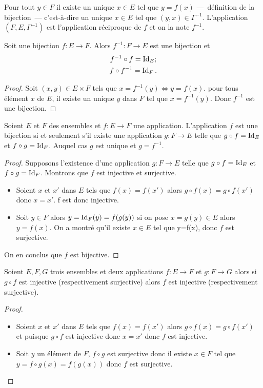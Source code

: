 Pour tout $y \in F$ il existe un unique $x \in E$ tel que $y=f(x)$ ---~définition de la bijection~--- c'est-à-dire un unique $x \in E$ tel que $(y,x) \in \Gamma^{-1}$. L'application $(F,E,\Gamma^{-1})$ est l'application réciproque de $f$ et on la note $f^{-1}$.
%
\begin{prop} Soit une bijection $f : E \longrightarrow F$. Alors $f^{-1} : F \longrightarrow E$ est une bijection et
  \begin{gather}
    f^{-1} \circ f =\operatorname{Id}_E; \\
    f \circ f^{-1}=\operatorname{Id}_F.
  \end{gather}
\end{prop}
\begin{proof}
Soit $(x,y) \in E \times F$ tels que $x=f^{-1}(y) \iff y=f(x)$. pour tous élément $x$ de $E$, il existe un unique $y$ dans $F$ tel que $x=f^{-1}(y)$. Donc $f^{-1}$ est une bijection.
\end{proof}
%
\begin{theo}
Soient $E$ et $F$ des ensembles et $f:E \longrightarrow F$ une application. L'application $f$ est une bijection si et seulement s'il existe une application $g:F \longrightarrow E$ telle que $g \circ f = \operatorname{Id}_E$ et $f \circ g = \operatorname{Id}_F$. Auquel cas $g$ est unique et $g=f^{-1}$.
\end{theo}
\begin{proof}
  Supposons l'existence d'une application $g:F \longrightarrow E$ telle que $g \circ f = \operatorname{Id}_E$ et $f \circ g = \operatorname{Id}_F$. Montrons que $f$ est injective et surjective.
  \begin{itemize}
  \item Soient $x$ et $x'$ dans $E$ tels que $f(x)=f(x')$ alors $g \circ f(x) = g \circ f(x')$ donc $x=x'$. f est donc injective.
  \item Soit $y \in F$ alors $y=\operatorname{Id}_F(y)=f(g(y))$ si on pose $x=g(y) \in E$ alors $y=f(x)$. On a montré qu'il existe $x \in E$ tel que y=f(x), donc $f$ est surjective.
  \end{itemize}
  On en conclus que $f$ est bijective.
\end{proof}
%
\begin{prop}
  Soient $E,F,G$ trois ensembles et deux applications $f:E \longrightarrow F$ et $g:F \longrightarrow G$ alors si $g \circ f$ est injective (respectivement surjective) alors $f$ est injective (respectivement surjective).
\end{prop}
\begin{proof}
  \begin{itemize}
  \item Soient $x$ et $x'$ dans $E$ tels que $f(x)=f(x')$ alors $g \circ f(x) = g \circ f(x')$ et puisque $g \circ f$ est injective donc $x=x'$ donc $f$ est injective.
  \item Soit $y$ un élément de $F$, $f \circ g$ est surjective donc il existe $x \in F$ tel que $y=f \circ g(x)=f(g(x))$ donc $f$ est surjective.
  \end{itemize}
\end{proof}
